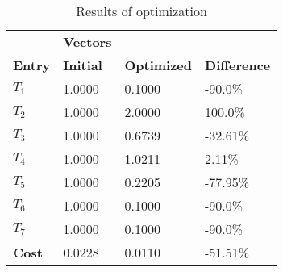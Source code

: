 \begin{table}[H]
\centering
\begin{tabular}{llll}
\textbf{}      & \cellcolor[HTML]{EFEFEF}\textbf{Vectors} & \textbf{} & \textbf{}         \\
\rowcolor[HTML]{EFEFEF} 
\textbf{Entry} & \textbf{Initial} & \textbf{Optimized} & \textbf{Difference} \\
$T_1$ & 1.0000 & 0.1000 & -90.0\% \\ 
$T_2$ & 1.0000 & 2.0000 & 100.0\% \\ 
$T_3$ & 1.0000 & 0.6739 & -32.61\% \\ 
$T_4$ & 1.0000 & 1.0211 & 2.11\% \\ 
$T_5$ & 1.0000 & 0.2205 & -77.95\% \\ 
$T_6$ & 1.0000 & 0.1000 & -90.0\% \\ 
$T_7$ & 1.0000 & 0.1000 & -90.0\% \\ 
\rowcolor[HTML]{EFEFEF} 
\textbf{Cost}  & 0.0228 & 0.0110 & -51.51\% \\ 
\end{tabular}
\caption{Results of optimization}
\label{tab:OptimizationAnalysis}
\end{table}